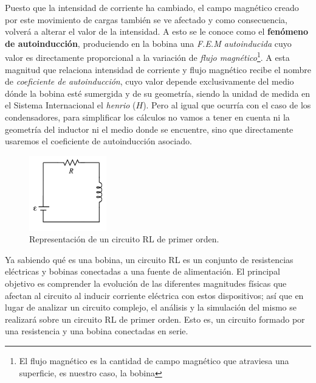 \documentclass[../main.tex]{subfiles}
\begin{document}
Puesto que la intensidad de corriente ha cambiado, el campo magnético creado por este movimiento de cargas también se ve afectado y como consecuencia, volverá a alterar el valor de la intensidad. A esto se le conoce como el \textbf{fenómeno de autoinducción}, produciendo en la bobina una \textit{F.E.M autoinducida} cuyo valor es directamente proporcional a la variación de \textit{flujo magnético}\footnote{El flujo magnético es la cantidad de campo magnético que atraviesa una superficie, es nuestro caso, la bobina}. A esta magnitud que relaciona intensidad de corriente y flujo magnético recibe el nombre de \textit{coeficiente de autoinducción}, cuyo valor depende exclusivamente del medio dónde la bobina esté sumergida y de su geometría, siendo la unidad de medida en el Sistema Internacional el \textit{henrio} ($H$). Pero al igual que ocurría con el caso de los condensadores, para simplificar los cálculos no vamos a tener en cuenta ni la geometría del inductor ni el medio donde se encuentre, sino que directamente usaremos el coeficiente de autoinducción asociado. \\

\begin{figure}[!h]
          \centering
          \includegraphics[width=0.3\textwidth]{images/Circuito_RL.png}
          \caption{Representación de un circuito RL de primer orden.}
          \label{fig::circuito_rL_representación}
\end{figure}

Ya sabiendo qué es una bobina, un circuito RL es un conjunto de resistencias eléctricas y bobinas conectadas a una fuente de alimentación. El principal objetivo es comprender la evolución de las diferentes magnitudes físicas que afectan al circuito al inducir corriente eléctrica con estos dispositivos; así que en lugar de analizar un circuito complejo, el análisis y la simulación del mismo se realizará sobre un circuito RL de primer orden. Esto es, un circuito formado por una resistencia y una bobina conectadas en serie. \\
\end{document}
